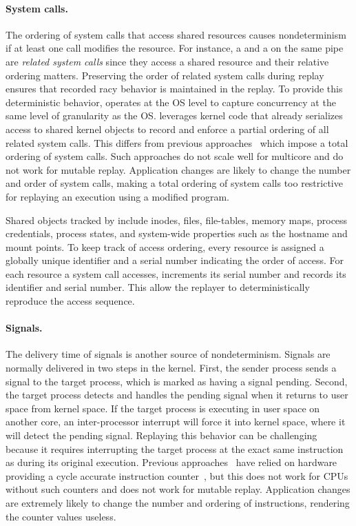 \paragraph{System calls.}
The ordering of system calls that access shared resources causes nondeterminism
if at least one call modifies the resource.
For instance, a  and a  on the same
pipe are \emph{related system calls} since they access a shared resource and
their relative ordering matters.  Preserving the order of related
system calls during replay ensures that recorded racy behavior is maintained in
the replay.
To provide this deterministic behavior, {\dora} operates at the OS level to
capture concurrency at the same level of granularity as the OS.
{\dora} leverages
kernel code that already serializes access to
shared kernel objects to record and enforce a partial ordering of all related
system calls.
This differs from previous approaches~\cite{r2:osdi,srinivasan:flashback} 
which impose a total ordering of system calls.  Such approaches do
not scale well for multicore and do not work for mutable
replay. Application changes are likely to change the number and order
of system calls, making a total ordering of system calls too
restrictive for replaying an execution using a modified program.  

Shared objects tracked by {\dora} include inodes, files,
file-tables, memory maps, process credentials, process states, and
system-wide properties such as the hostname and mount points.
To keep track of access ordering, every resource is assigned a
globally unique identifier and a serial number indicating the order of access.
For each resource a system call accesses, {\dora} increments its serial
number and records its identifier and serial number. This allow
the replayer to deterministically reproduce the access sequence.

\paragraph{Signals.}
The delivery time of signals is another source of nondeterminism.
Signals are normally delivered in two steps in the kernel.  First, the sender process sends a
signal to the target process, which is marked as having a signal
pending.  Second, the target process detects and handles the pending signal when
it returns to user space from kernel space.  If the target process
is executing in user space on another core, an inter-processor interrupt will force it
into kernel space, where it will detect the pending signal.
Replaying this behavior can be challenging because it requires
interrupting the target process at the exact same instruction as
during its original execution.  Previous
approaches~\cite{bressoud-tft,bressoud,revirt,smp-revirt}
have relied on hardware providing a cycle accurate instruction
counter~\cite{slye96}, but this does not work for CPUs
without such counters and does not work for mutable replay.
Application changes are extremely likely to change the number and
ordering of instructions, rendering the counter values useless.

